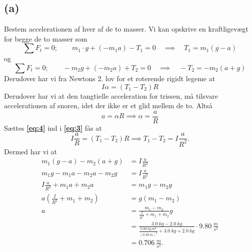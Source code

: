 \documentclass[12pt]{article}
\theoremstyle{definition}
\begin{document}
\subsection*{(a)}
Bestem accelerationen af hver af de to masser.
\bigbreak
Vi kan opskrive en kraftligevægt for begge de to masser som
\begin{equation} \label{eq:1}
  \sum F_t = 0; \qquad m_1\cdot g + (-m_1 a) -  T_1 = 0 \quad \implies \quad T_1 = m_1( g-a)
\end{equation}
og
\begin{equation} \label{eq:2}
  \sum F_t = 0; \qquad  - m_2g + (-m_2 a) + T_2 = 0 \quad \implies \quad - T_2 = -m_2 (a+g)
\end{equation}
Derudover har vi fra Newtons 2. lov for et roterende rigidt legeme at
\begin{equation} \label{eq:3}
  I \alpha = (T_1 - T_2) R
\end{equation}
Derudover har vi at den tangtielle acceleration for trissen, må tilsvare accelerationen af snoren, idet der ikke er et glid mellem de to. Altså
\begin{equation} \label{eq:4}
  a = \alpha R \implies \alpha = \frac{a}{R}
\end{equation}
Sættes \textbf{\autoref{eq:4}} ind i \textbf{\autoref{eq:3}} fås at
\[ 
I \frac{a}{R} = (T_1 - T_2) R \implies T_1 - T_2 = I \frac{a}{R^2}
.\]
Dermed har vi at
\begin{align*}
  m_1 (g-a) - m_2 (a+g) &= I \frac{a}{R^2} \\
  m_1g - m_1a - m_2a - m_2g &= I \frac{a}{R^2} \\
  I \frac{a}{R^2} + m_1 a + m_2 a &= m_1 g - m_2g \\
  a(\frac{I}{R^2} + m_1 + m_2) &= g(m_1 - m_2) \\
  a &= \frac{m_1 - m_2}{\frac{I}{R^2} + m_1 + m_2}g \\
  &= \frac{\qty{3,0}{kg} - \qty{2,0}{kg}}{\frac{\qty{0,80}{kg.m^2}}{\left( \qty{0,30}{m}  \right)^2} + \qty{3,0}{kg} + \qty{2,0}{kg}} \cdot \qty{9,80}{\frac{m}{s^2}}  \\
  &= \qty{0,706}{\frac{m}{s^2}} 
.\end{align*}
\end{document}
